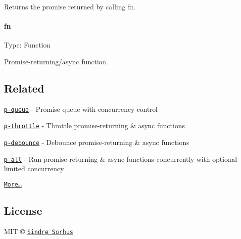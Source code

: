Returns the promise returned by calling {\ttfamily fn}.

\paragraph*{fn}

Type\+: {\ttfamily Function}

Promise-\/returning/async function.

\subsection*{Related}


\begin{DoxyItemize}
\item \href{https://github.com/sindresorhus/p-queue}{\tt p-\/queue} -\/ Promise queue with concurrency control
\item \href{https://github.com/sindresorhus/p-throttle}{\tt p-\/throttle} -\/ Throttle promise-\/returning \& async functions
\item \href{https://github.com/sindresorhus/p-debounce}{\tt p-\/debounce} -\/ Debounce promise-\/returning \& async functions
\item \href{https://github.com/sindresorhus/p-all}{\tt p-\/all} -\/ Run promise-\/returning \& async functions concurrently with optional limited concurrency
\item \href{https://github.com/sindresorhus/promise-fun}{\tt More…}
\end{DoxyItemize}

\subsection*{License}

M\+IT © \href{https://sindresorhus.com}{\tt Sindre Sorhus} 